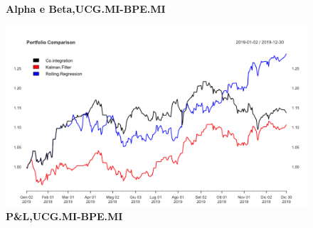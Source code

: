 \documentclass[]{article}
\begin{document}
\
\\
\begin{figure}[htp]
	\begin{center}
		
		
		
		\caption{\textbf{Alpha e Beta,UCG.MI-BPE.MI}}
		
	\end{center}
\end{figure}


\begin{figure}
	\centering
	\includegraphics[scale=0.3]{ucg_bpe_portfolio.png}
	\caption{\textbf{P\&L,UCG.MI-BPE.MI}}
\end{figure}
\end{document}
